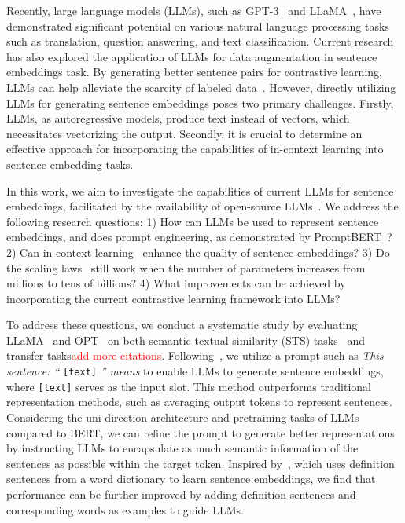 \documentclass{article}
\begin{document}
Recently, large language models (LLMs), such as GPT-3~\cite{gpt3} and LLaMA~\cite{touvron2023llama}, have demonstrated significant potential on various natural language processing tasks such as translation, question answering, and text classification.
Current research has also explored the application of LLMs for data augmentation in sentence embeddings task. By generating better sentence pairs for contrastive learning, LLMs can help alleviate the scarcity of labeled data~\cite{cheng2023improving, zhang2023contrastive}. 
However, directly utilizing LLMs for generating sentence embeddings poses two primary challenges. Firstly, LLMs, as autoregressive models, produce text instead of vectors, which necessitates vectorizing the output. Secondly, it is crucial to determine an effective approach for incorporating the capabilities of in-context learning into sentence embedding tasks.

In this work, we aim to investigate the capabilities of current LLMs for sentence embeddings, facilitated by the availability of open-source LLMs~\cite{touvron2023llama, zhang2022opt}. We address the following research questions: 1) How can LLMs be used to represent sentence embeddings, and does prompt engineering, as demonstrated by PromptBERT~\cite{jiang2022promptbert}? 2) Can in-context learning~\cite{liu2023pre} enhance the quality of sentence embeddings? 3) Do the scaling laws~\cite{kaplan2020scaling} still work when the number of parameters increases from millions to tens of billions? 4) What improvements can be achieved by incorporating the current contrastive learning framework into LLMs?


To address these questions, we conduct a systematic study by evaluating LLaMA~\cite{touvron2023llama} and OPT~\cite{zhang2022opt} on both semantic textual similarity (STS) tasks~\cite{cer2017semeval} and transfer tasks\textcolor{red}{add more citations}. Following~\cite{jiang2022promptbert}, we utilize a prompt such as \textit{This sentence: ``} \texttt{[text]} \textit{'' means} to enable LLMs to generate sentence embeddings, where \texttt{[text]} serves as the input slot. This method outperforms traditional representation methods, such as averaging output tokens to represent sentences.
Considering the uni-direction architecture and pretraining tasks of LLMs compared to BERT, we can refine the prompt to generate better representations by instructing LLMs to encapsulate as much semantic information of the sentences as possible within the target token. Inspired by~\cite{tsukagoshi-etal-2021-defsent}, which uses definition sentences from a word dictionary to learn sentence embeddings, we find that performance can be further improved by adding definition sentences and corresponding words as examples to guide LLMs.
\end{document}
